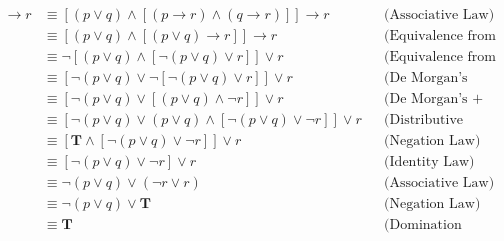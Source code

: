 \begin{itemize}
\begin{enumerate}[a.]
\begin{align*}
                        [(p \lor q) \land (p \to r) \land (q \to r)] \to r
                        & \equiv [(p \lor q) \land [(p \to r) \land (q \to r)]] \to r && \text{(Associative Law)} \\
                        & \equiv [(p \lor q) \land [(p \lor q) \to r]] \to r && \text{(Equivalence from table)} \\ 
                        & \equiv \neg [(p \lor q) \land [\neg (p \lor q) \lor r]] \lor r && \text{(Equivalence from table)} \\
                        & \equiv [\neg (p \lor q) \lor \neg[\neg (p \lor q) \lor r]] \lor r && \text{(De Morgan’s Law)} \\
                        & \equiv [\neg(p \lor q) \lor [(p \lor q) \land \neg r]] \lor r && \text{(De Morgan’s + Double Negation)} \\
                        & \equiv [\neg(p \lor q) \lor (p \lor q) \land [\neg(p \lor q) \lor \neg r]] \lor r &&\text{(Distributive Law)} \\
                        & \equiv [\mathbf{T} \land [\neg(p \lor q) \lor \neg r]] \lor r && \text{(Negation Law)} \\
                        & \equiv [\neg(p \lor q) \lor \neg r] \lor r && \text{(Identity Law)} \\
                        & \equiv \neg(p \lor q) \lor (\neg r \lor r) &&\text{(Associative Law)} \\
                        & \equiv \neg(p \lor q) \lor \mathbf{T} && \text{(Negation Law)} \\
                        & \equiv \mathbf{T}  && \text{(Domination Law)}
                    \end{align*}
          \end{enumerate}

\end{itemize}
